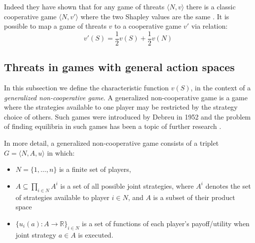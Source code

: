 Indeed they have shown that for any game of threats $\langle N,v\rangle$ there is a classic cooperative game $\langle N,v'\rangle$ where the two Shapley values are the same \cite{KOHLBERG2018139}.
It is possible to map a game of threats $v$ to a cooperative game $v'$ via relation:
\begin{equation}\label{convert1}
v'(S)=\frac{1}{2}v(S)+\frac{1}{2}v(N)
\end{equation}


\subsection{Threats in games with general action spaces}\label{the_value_def3}

In this subsection we define the characteristic function $v(S)$, in the context of a \textit{generalized non-cooperative game}.
A generalized non-cooperative game is a game where the strategies available to one player may be restricted by the strategy choice of others.
Such games were introduced by Debreu in 1952 \cite{Debreu01101952} and the problem of finding equilibria in such games has been a topic of further research \cite{Facchinei2007,fischer2014,DutangSurvey}.

In more detail, a generalized non-cooperative game consists of a triplet $G = \langle N,A,u \rangle$ in which:
\begin{itemize}
\item	$N=\{1,\dots,n\}$ is a finite set of players,
\item	$A\subseteq \prod_{i\in N}A^i$ is a set of all possible joint strategies, where $A^i$ denotes the set of strategies available to player $i\in N$, and $A$ is a subset of their product space
\item	$\{u_i(a) : A\rightarrow \mathbb{R}\}_{i\in N}$ is a set of functions of each player's payoff/utility when joint strategy $a\in A$ is executed.
\end{itemize}

